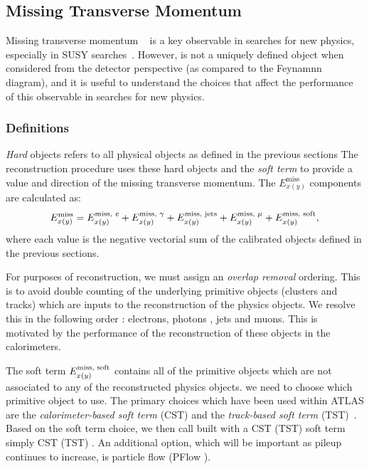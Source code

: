 \subsection{Missing Transverse Momentum}

Missing transverse momentum \met ~\cite{Aad:2016nrq} is a key observable in searches for new physics, especially in SUSY searches~\cite{ATL-PHYS-PUB-2010-010,ATL-PHYS-PUB-2015-005}.
However, \met is not a uniquely defined object when considered from the detector perspective (as compared to the Feynamnn diagram), and it is useful to understand the choices that affect the performance of this observable in searches for new physics.

\subsubsection{\met Definitions}

\textit{Hard} objects refers to all physical objects as defined in the previous sections
The \met reconstruction procedure uses these hard objects and the \textit{soft term} to provide a value and direction of the missing transverse momentum.
The $E^{\text{miss}}_{x(y)}$ components are calculated as:
\begin{equation}
  \Emiss{x(y)} = \Emisscomp{x(y)}{\text{\textit{e}}}
               + \Emisscomp{x(y)}{\gamma}
               + \Emisscomp{x(y)}{\text{jets}}
               + \Emisscomp{x(y)}{\mu}
               + \Emisscomp{x(y)}{\text{soft}},
  \label{eq:met-sum}
\end{equation}
where each value  is the negative vectorial sum of the calibrated objects defined in the previous sections.

For purposes of \met reconstruction, we must assign an \textit{overlap removal} ordering.
This is to avoid double counting of the underlying primitive objects (clusters and tracks) which are inputs to the reconstruction of the physics objects.
We resolve this in the following order : electrons, photons , jets and muons.
This is motivated by the performance of the reconstruction of these objects in the calorimeters.

The soft term $\Emisscomp{x(y)}{\text{soft}}$ contains all of the primitive objects which are not associated to any of the reconstructed physics objects.
we need to choose which primitive object to use.
The primary choices which have been used within ATLAS are the \textit{ calorimeter-based soft term} (CST) and the \textit{track-based soft term} (TST)~\cite{Aad:2016nrq}.
Based on the soft term choice, we then call \met built with a CST (TST) soft term simply CST (TST) \met.
An additional option, which will be important as pileup continues to increase, is particle flow \met (PFlow \met).

